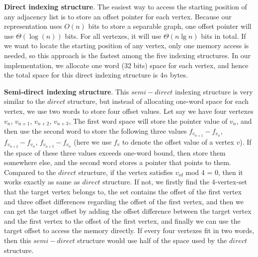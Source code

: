 \documentclass[12pt,glossary]{dalthesis}
\begin{document}
\bigskip
\bigskip

\textbf{Direct indexing structure}. The easiest way to access the starting position of 
any adjacency list is to store an offset pointer for each vertex. Because our representation uses $O(n)$ bits to store a separable graph, one offset pointer will use $\Theta (\log (n))$ bits. For all vertexes, it will use $ \Theta (n\lg n)$ bits in total. If we want to locate the starting position of any vertex, only one memory access is needed, so this approach is the fastest among the five indexing structures. In our implementation, we allocate one word (32 bits) space for each vertex, and hence the total space for this direct indexing structure is 4$n$ bytes.

\bigskip
\bigskip

\textbf{Semi-direct indexing structure}. This $semi-direct$ indexing structure is very similar to the $direct$ structure, but instead of allocating one-word space for each vertex, we use two words to store four offset values. Let say we have four vertexes $v_{n}$, $v_{n+1}$, $v_{n+2}$, $v_{n+3}$, The first word space will store the pointer value of $v_{n}$, and then use the second word to store the following three values $f_{v_{n+1}}-f_{v_{n}}$, $f_{v_{n+2}}-f_{v_{n}}$, $f_{v_{n+3}}-f_{v_{n}}$ (here we use $f_{v}$ to denote the offset value of a vertex $v$). If the space of these three values exceeds one-word bound, then store them somewhere else, and the second word stores a pointer that points to them. Compared to the $direct$ structure, if the vertex satisfies $v_{id}$ mod 4 = 0, then it works exactly as same as $direct$ structure. If not, we firstly find the 4-vertex-set that the target vertex belongs to, the set contains the offset of the first vertex and three offset differences regarding the offset of the first vertex, and then we can get the target offset by adding the offset difference between the target vertex and the first vertex to the offset of the first vertex, and finally we can use the target offset to access the memory directly. If every four vertexes fit in two words, then this $semi-direct$ structure would use half of the space used by the $direct$ structure.     

\bigskip
\bigskip
\end{document}
